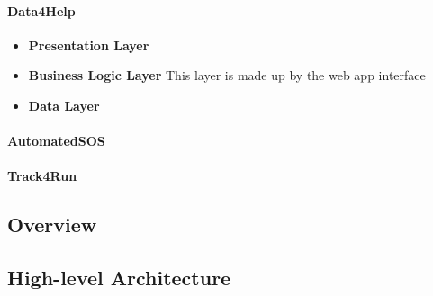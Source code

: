 \documentclass[a4paper]{article}
\begin{document}
\paragraph{Data4Help}

\begin{itemize}
    \item \textbf{Presentation Layer}
    
    \item \textbf{Business Logic Layer} This layer is made up by the web app interface 
    
    \item \textbf{Data Layer}
    
\end{itemize}

\paragraph{AutomatedSOS}

\paragraph{Track4Run}

\subsection{Overview}

\subsection{High-level Architecture}

\clearpage
\end{document}

